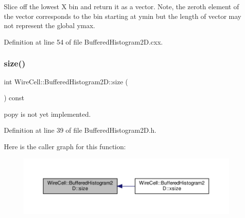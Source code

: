 Slice off the lowest X bin and return it as a vector. Note, the zeroth element of the vector corresponds to the bin starting at ymin but the length of vector may not represent the global ymax. 

Definition at line 54 of file Buffered\+Histogram2\+D.\+cxx.

\mbox{\label{class_wire_cell_1_1_buffered_histogram2_d_a137d22d7e24ae8f1cd8a99608601bceb}} 
\subsubsection{\texorpdfstring{size()}{size()}}
{\footnotesize\ttfamily int Wire\+Cell\+::\+Buffered\+Histogram2\+D\+::size (\begin{DoxyParamCaption}{ }\end{DoxyParamCaption}) const\hspace{0.3cm}{\ttfamily [inline]}}



popy is not yet implemented. 



Definition at line 39 of file Buffered\+Histogram2\+D.\+h.

Here is the caller graph for this function\+:
\nopagebreak
\begin{figure}[H]
\begin{center}
\leavevmode
\includegraphics[width=350pt]{class_wire_cell_1_1_buffered_histogram2_d_a137d22d7e24ae8f1cd8a99608601bceb_icgraph}
\end{center}
\end{figure}
\mbox{\label{class_wire_cell_1_1_buffered_histogram2_d_a3c2df0d26df3d418fe85d01ac21bf868}} 
